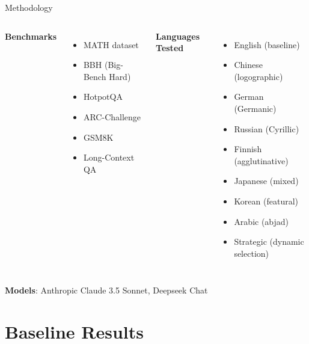 \documentclass{beamer}
\begin{document}
\begin{frame}{Methodology}
    \begin{columns}
        \textbf{Benchmarks}
        \begin{itemize}
            \item MATH dataset
            \item BBH (Big-Bench Hard)
            \item HotpotQA
            \item ARC-Challenge
            \item GSM8K
            \item Long-Context QA
        \end{itemize}
        
        \textbf{Languages Tested}
        \begin{itemize}
            \item English (baseline)
            \item Chinese (logographic)
            \item German (Germanic)
            \item Russian (Cyrillic)
            \item Finnish (agglutinative)
            \item Japanese (mixed)
            \item Korean (featural)
            \item Arabic (abjad)
            \item Strategic (dynamic selection)
        \end{itemize}
    \end{columns}
    
    \vspace{0.5cm}
    \textbf{Models}: Anthropic Claude 3.5 Sonnet, Deepseek Chat
\end{frame}

\section{Baseline Results}
\end{document}
